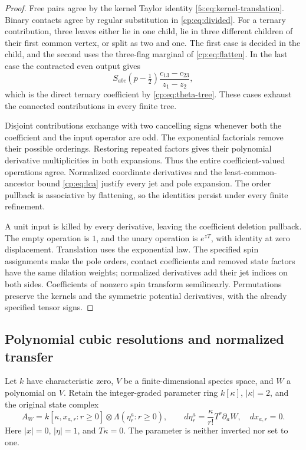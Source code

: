 \begin{proof}
Free pairs agree by the kernel Taylor identity
\eqref{fs:eq:kernel-translation}.  Binary contacts agree by regular
substitution in \eqref{cp:eq:divided}.  For a ternary contribution,
three leaves either lie in one child, lie in three different children
of their first common vertex, or split as two and one.  The first
case is decided in the child, and the second uses the three-flag
marginal of \eqref{cp:eq:flatten}.  In the last case the contracted
even output gives
\[
 S_{abc}(p-\tfrac12)
             \frac{c_{13}-c_{23}}{z_1-z_2},
\]
which is the direct ternary coefficient by
\eqref{cp:eq:theta-tree}.  These cases exhaust the connected
contributions in every finite tree.

Disjoint contributions exchange with two cancelling signs whenever
both the coefficient and the input operator are odd.  The exponential
factorials remove their possible orderings.  Restoring repeated
factors gives their polynomial derivative multiplicities in both
expansions.  Thus the entire coefficient-valued operations agree.
Normalized coordinate derivatives and the least-common-ancestor
bound \eqref{cp:eq:lca} justify every jet and pole expansion.
The order pullback is associative by flattening, so the identities
persist under every finite refinement.

A unit input is killed by every derivative, leaving the coefficient
deletion pullback.  The empty operation is \(1\), and the unary
operation is \(e^{zT}\), with identity at zero displacement.
Translation uses the exponential law.  The specified spin assignments
make the pole orders, contact coefficients and removed state factors
have the same dilation weights; normalized derivatives add their
jet indices on both sides.  Coefficients of nonzero spin transform
semilinearly.  Permutations preserve the kernels and the symmetric
potential derivatives, with the already specified tensor signs.
\end{proof}

\subsection{Polynomial cubic resolutions and normalized transfer}

Let \(k\) have characteristic zero, \(V\) be a finite-dimensional
species space, and \(W\) a polynomial on \(V\).  Retain the
integer-graded parameter ring \(k[\kappa]\), \(|\kappa|=2\), and
the original state complex
\begin{equation}\label{cp:eq:physical}
 A_W=k[\kappa,x_{a,r}:r\geq0]\otimes
                    \Lambda(\eta^a_r:r\geq0),
 \qquad
 d\eta^a_r=\frac{\kappa}{r!}T^r\partial_aW,\quad dx_{a,r}=0.
\end{equation}
Here \(|x|=0\), \(|\eta|=1\), and \(T\kappa=0\).
The parameter is neither inverted nor set to one.

